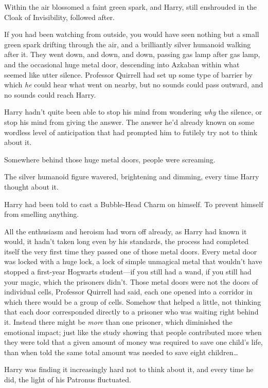 Within the air blossomed a faint green spark, and Harry, still enshrouded in
the Cloak of Invisibility, followed after.

If you had been watching from outside, you would have seen nothing but a small
green spark drifting through the air, and a brilliantly silver humanoid walking
after it.
\later
They went down, and down, and down, passing gas lamp after gas lamp, and the
occasional huge metal door, descending into Azkaban within what seemed like
utter silence. Professor Quirrell had set up some type of barrier by which
\emph{he} could hear what went on nearby, but no sounds could pass outward, and
no sounds could reach Harry.

Harry hadn't quite been able to stop his mind from wondering \emph{why} the
silence, or stop his mind from giving the answer. The answer he'd already known
on some wordless level of anticipation that had prompted him to futilely try
not to think about it.

Somewhere behind those huge metal doors, people were screaming.

The silver humanoid figure wavered, brightening and dimming, every time Harry
thought about it.

Harry had been told to cast a Bubble-Head Charm on himself. To prevent himself
from smelling anything.

All the enthusiasm and heroism had worn off already, as Harry had known it
would, it hadn't taken long even by his standards, the process had completed
itself the very first time they passed one of those metal doors. Every metal
door was locked with a huge lock, a lock of simple unmagical metal that
wouldn't have stopped a first-year Hogwarts student---if you still had a wand,
if you still had your magic, which the prisoners didn't. Those metal doors were
not the doors of individual cells, Professor Quirrell had said, each one opened
into a corridor in which there would be a group of cells. Somehow that helped a
little, not thinking that each door corresponded directly to a prisoner who was
waiting right behind it. Instead there might be \emph{more} than one prisoner,
which diminished the emotional impact; just like the study showing that people
contributed more when they were told that a given amount of money was required
to save one child's life, than when told the same total amount was needed to
save eight children{\ldots}

Harry was finding it increasingly hard not to think about it, and every time he
did, the light of his Patronus fluctuated.

